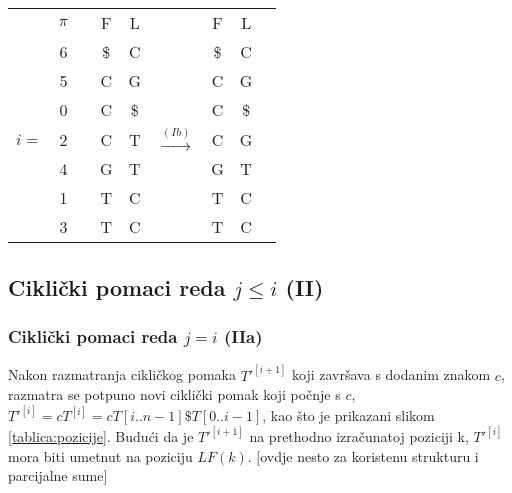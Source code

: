 \documentclass{ferseminar}
\begin{document}
\begin{minipage}{0.45\textwidth}
\begin{tabular}{cccc|ccc|cc}
	& $\pi$ &  & F & L & & F & L \\
	\cline{2-2} \cline{4-5} \cline{7-8}
	& 6 & & \$ & C & & \$ & C \\
	& 5 & & C & G & & C & G \\
	& 0 & & C & \$ & & C & \$ \\
	\cline{1-8}
	\multicolumn{1}{|c}{$i=$}& 2 & & C & T & $\stackrel{(Ib)}{\longrightarrow}$ & C & \multicolumn{1}{c|}{G} \\
	\cline{1-8}
	& 4 & & G & T & & G & T \\
	& 1 & & T & C & & T & C \\
	& 3 & & T & C & & T & C 
\end{tabular}

\end{minipage}


\subsection{Ciklički pomaci reda $j\leq i$ (II)}
\subsubsection{Ciklički pomaci reda $j=i$ (IIa)}
Nakon razmatranja cikličkog pomaka $T'^{[i+1]}$ koji završava s dodanim znakom $c$, razmatra se potpuno novi ciklički pomak koji počnje s $c$, $T'^{[i]}=cT^{[i]}=cT[i..n-1]\$T[0..i-1]$, kao što je prikazani slikom \ref{tablica:pozicije}. Budući da je $T'^{[i+1]}$ na prethodno izračunatoj poziciji k, $T'^[i]$ mora biti umetnut na poziciju $LF(k)$. [ovdje nesto za koristenu strukturu i parcijalne sume]
\end{document}

